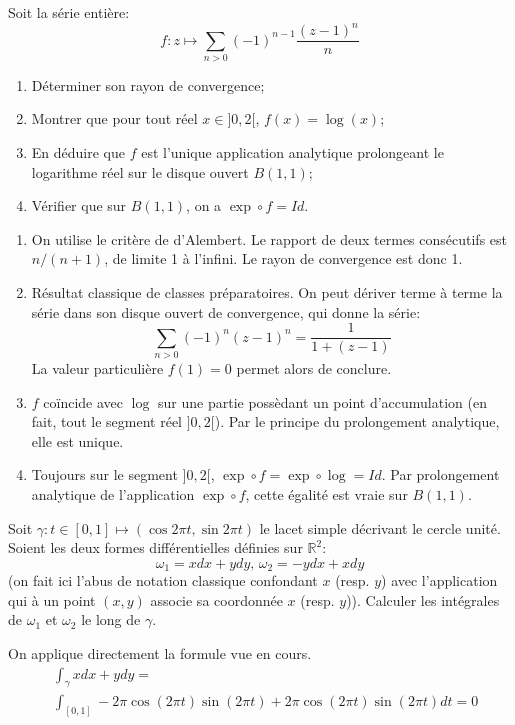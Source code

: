 \documentclass[a4paper, 12pt]{amsart}
\begin{document}
\begin{fex}
 Soit la série entière:
\[
f \colon z \mapsto \sum_{n >0}(-1)^{n-1}\frac{(z-1)^n}{n}
\]
\begin{enumerate}
  \item Déterminer son rayon de convergence;
  \item Montrer que pour tout réel $x \in ]0,2[$, $f(x)=\log(x)$;
  \item En déduire que $f$ est l'unique application analytique prolongeant le
  logarithme réel sur le disque ouvert $B(1,1)$;
  \item Vérifier que sur $B(1,1)$, on a $\exp \circ f = Id$.
\end{enumerate}
\end{fex}
\begin{enumerate}
 \item On utilise le critère de d'Alembert. Le rapport de deux termes
consécutifs est $n/(n+1)$, de limite 1 à l'infini. Le rayon de convergence est
donc 1.
\item Résultat classique de classes préparatoires. On peut dériver terme à
terme la série dans son disque ouvert de convergence, qui donne la série:
\[
\sum_{n >0}(-1)^{n} (z-1)^n = \frac{1}{1+(z-1)}
\]
La valeur particulière $f(1)=0$ permet alors de conclure.
\item $f$ coïncide avec $\log$ sur une partie possèdant un point d'accumulation
(en fait, tout le segment réel $]0,2[$). Par le principe du prolongement
analytique, elle est unique.
\item Toujours sur le segment $]0,2[$, $\exp \circ f = \exp \circ \log = Id$.
Par prolongement analytique de l'application $\exp \circ f$, cette égalité est
vraie sur $B(1,1)$.
\end{enumerate}
\begin{fex}
Soit $\gamma \colon t \in [0,1] \mapsto (\cos 2 \pi t, \sin 2 \pi t)$ le lacet
simple décrivant le cercle unité. Soient les deux formes différentielles
définies sur $\mathbb{R}^2$:
\[
\omega_1 =  x dx + y dy, \, \omega_2 = -y dx + x dy
\]
(on fait ici l'abus de notation classique confondant $x$ (resp. $y$) avec
l'application qui à un point $(x,y)$ associe sa coordonnée $x$ (resp. $y$)).
Calculer les intégrales de $\omega_1$ et $\omega_2$ le long de $\gamma$.
\end{fex}
On applique directement la formule vue en cours.
\begin{align*}
&\int_{\gamma} x dx + y dy = \\ 
& \int_{[0,1]} - 2 \pi \cos\left( 2 \pi t \right) \sin\left( 2 \pi t \right) + 2 \pi \cos\left( 2 \pi t \right) \sin\left( 2 \pi t \right) dt = 0
\end{align*}
\end{document}
